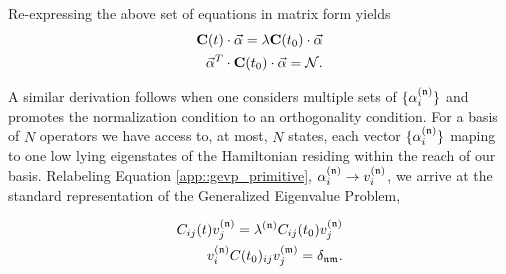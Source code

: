 Re-expressing the above set of equations in matrix form yields 
\begin{align}
\mathbf{C}(t) \cdot \vec{\alpha} = \lambda \mathbf{C}(t_0) \cdot \vec{\alpha} \notag \\ 
\vec{\mathbf{\alpha}}^T\cdot \mathbf{C}(t_0) \cdot \vec{\alpha} = \mathcal{N}.  \label{app::gevp_primitive}
\end{align}

A similar derivation follows when one considers multiple sets of $\{\alpha^{(\mathfrak{n})}_i\}$ and promotes the normalization condition to an orthogonality condition. For a basis of $N$ operators we have access to, at most, $N$ states, each vector $\{\alpha^{(\mathfrak{n})}_i\}$ maping to one low lying eigenstates of the Hamiltonian residing within the reach of our basis. Relabeling Equation \ref{app::gevp_primitive}, $\alpha^{(\mathfrak{n})}_i \rightarrow v^{(\mathfrak{n})}_i$, we arrive at the standard representation of the Generalized Eigenvalue Problem, 
 
\begin{align}
C_{ij}(t)v^{(\mathfrak{n})}_j   = \lambda^{(\mathfrak{n})} C_{ij}(t_0)v^{(\mathfrak{n})}_j \notag \\ 
v^{(\mathfrak{n})}_i C(t_0)_{ij}v^{(\mathfrak{m})}_j  = \delta_{\mathfrak{n}\mathfrak{m}}.  \label{app::gevp}
\end{align}


